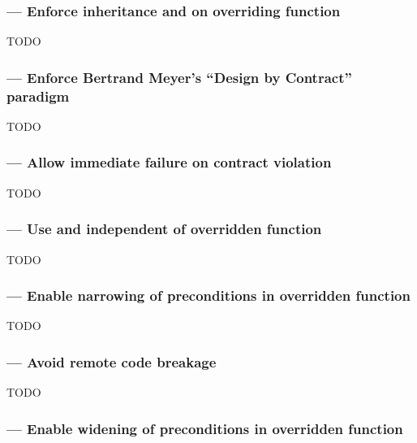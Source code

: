 




\subsubsection{ --- Enforce inheritance  and  on overriding function}


TODO

\subsubsection{ --- Enforce Bertrand Meyer's ``Design by Contract'' paradigm}

TODO

\subsubsection{ --- Allow immediate failure on contract violation}

TODO

\subsubsection{ --- Use  and  independent of overridden function}

TODO

\subsubsection{ --- Enable narrowing of preconditions in overridden function}

TODO

\subsubsection{ --- Avoid remote code breakage}

TODO

\subsubsection{ --- Enable widening of preconditions in overridden function}

